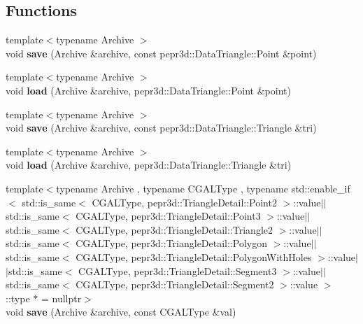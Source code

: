 \subsection*{Functions}
\begin{DoxyCompactItemize}
\item 
\mbox{\label{namespace_c_g_a_l_a602854533e0d5112cb02bfacebed884d}} 
{\footnotesize template$<$typename Archive $>$ }\\void {\bfseries save} (Archive \&archive, const pepr3d\+::\+Data\+Triangle\+::\+Point \&point)
\item 
\mbox{\label{namespace_c_g_a_l_a1630db22c4c98e2b6ccb9bc5910446f8}} 
{\footnotesize template$<$typename Archive $>$ }\\void {\bfseries load} (Archive \&archive, pepr3d\+::\+Data\+Triangle\+::\+Point \&point)
\item 
\mbox{\label{namespace_c_g_a_l_a78ae9fe06ee1c036522259d598cdfe74}} 
{\footnotesize template$<$typename Archive $>$ }\\void {\bfseries save} (Archive \&archive, const pepr3d\+::\+Data\+Triangle\+::\+Triangle \&tri)
\item 
\mbox{\label{namespace_c_g_a_l_abfc277fbf04b109f3fc9705606725259}} 
{\footnotesize template$<$typename Archive $>$ }\\void {\bfseries load} (Archive \&archive, pepr3d\+::\+Data\+Triangle\+::\+Triangle \&tri)
\item 
\mbox{\label{namespace_c_g_a_l_aaa97dff8592ff2642e7d3eeabbb3576b}} 
{\footnotesize template$<$typename Archive , typename C\+G\+A\+L\+Type , typename std\+::enable\+\_\+if$<$ std\+::is\+\_\+same$<$ C\+G\+A\+L\+Type, pepr3d\+::\+Triangle\+Detail\+::\+Point2 $>$\+::value$\vert$$\vert$std\+::is\+\_\+same$<$ C\+G\+A\+L\+Type, pepr3d\+::\+Triangle\+Detail\+::\+Point3 $>$\+::value$\vert$$\vert$std\+::is\+\_\+same$<$ C\+G\+A\+L\+Type, pepr3d\+::\+Triangle\+Detail\+::\+Triangle2 $>$\+::value$\vert$$\vert$std\+::is\+\_\+same$<$ C\+G\+A\+L\+Type, pepr3d\+::\+Triangle\+Detail\+::\+Polygon $>$\+::value$\vert$$\vert$std\+::is\+\_\+same$<$ C\+G\+A\+L\+Type, pepr3d\+::\+Triangle\+Detail\+::\+Polygon\+With\+Holes $>$\+::value$\vert$$\vert$std\+::is\+\_\+same$<$ C\+G\+A\+L\+Type, pepr3d\+::\+Triangle\+Detail\+::\+Segment3 $>$\+::value$\vert$$\vert$std\+::is\+\_\+same$<$ C\+G\+A\+L\+Type, pepr3d\+::\+Triangle\+Detail\+::\+Segment2 $>$\+::value $>$\+::type $\ast$  = nullptr$>$ }\\void {\bfseries save} (Archive \&archive, const C\+G\+A\+L\+Type \&val)

\end{DoxyCompactItemize}
